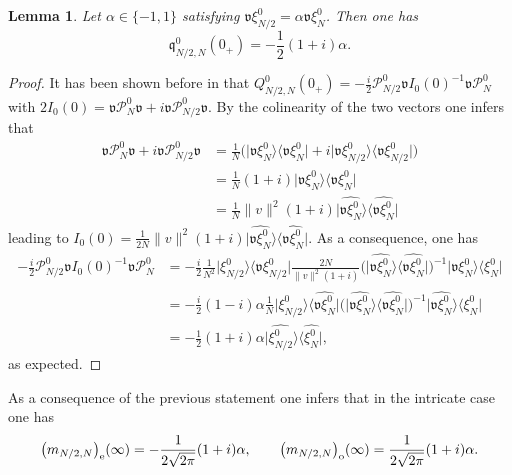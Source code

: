 \documentclass[11pt]{article}
\def\P{\mathcal P}
\def\v{\mathfrak v}
\def\ltwo{\mathop{\mathrm{L}^2}\nolimits}
\def\q{\mathfrak{q}}
\newtheorem{Lemma}[Theorem]{Lemma}
\begin{document}
\begin{Lemma}\label{lem_limit1}
Let $\alpha\in \{-1,1\}$ satisfying $\v\xi^0_{N/2}=\alpha \v \xi^0_N$. Then one has
$$
\q^0_{N/2,N}(0_+) = -\frac{1}{2}(1+i)\alpha.
$$
\end{Lemma}

\begin{proof}
It has been shown before in \cite[Lemma 4.10]{NRT} that $Q^0_{N/2,N}(0_+)= -\frac{i}{2}\P^0_{N/2}\v I_0(0)^{-1}\v\P^0_N$
with $2 I_0(0)=\v \P^0_N\v+i\v \P^0_{N/2}\v$.
By the colinearity of the two vectors one infers that
\begin{align*}
\v \P^0_N\v+i\v \P^0_{N/2}\v 
& = \frac{1}{N} \Big(\big|\v\xi_{N}^0\big\rangle \big\langle \v\xi_{N}^0\big|
+ i \big|\v\xi_{N/2}^0\big\rangle \big\langle \v\xi_{N/2}^0\big|\Big) \\
& = \frac{1}{N} (1+i)  \big|\v\xi_{N}^0\big\rangle \big\langle \v\xi_{N}^0\big| \\
& = \frac{1}{N}\|v\|_{\ltwo}^2 (1+i)  \big|\widehat{\v\xi_{N}^0}\big\rangle \big\langle \widehat{\v\xi_{N}^0}\big|
\end{align*}
leading to $I_0(0)=\frac{1}{2N} \|v\|_{\ltwo}^2 (1+i)  \big|\widehat{\v\xi_{N}^0}\big\rangle \big\langle \widehat{\v\xi_{N}^0}\big|$.
As a consequence, one has
\begin{align*}
-\frac{i}{2}\P^0_{N/2}\v I_0(0)^{-1}\v\P^0_N
& = -\frac{i}{2}\frac{1}{N^2}\big|\xi_{N/2}^0\big\rangle \big\langle \v\xi_{N/2}^0\big|
\frac{2N}{\|v\|_{\ltwo}^2 (1+i)} \Big( \big|\widehat{\v\xi_{N}^0}\big\rangle \big\langle \widehat{\v\xi_{N}^0}\big|\Big)^{-1}
\big|\v\xi_{N}^0\big\rangle \big\langle \xi_{N}^0\big| \\
& = -\frac{i}{2}(1-i) \alpha \frac{1}{N}\big|\xi_{N/2}^0\big\rangle \big\langle \widehat{\v\xi_{N}^0}\big|
\Big( \big|\widehat{\v\xi_{N}^0}\big\rangle \big\langle \widehat{\v\xi_{N}^0}\big|\Big)^{-1}
\big|\widehat{\v\xi_{N}^0}\big\rangle \big\langle \xi_{N}^0\big| \\
& = -\frac{1}{2}(1+i) \alpha \big|\widehat{\xi_{N/2}^0}\big\rangle  \big\langle \widehat{\xi_{N}^0}\big|,
\end{align*}
as expected.
\end{proof}

As a consequence of the previous statement one infers that in the intricate case one has
\begin{equation*}
\big(m_{N/2,N}\big)_{\rm e}(\infty) = -\frac{1}{2\sqrt{2\pi}}(1+i)\alpha, 
\qquad \big(m_{N/2,N}\big)_{\rm o}(\infty) = \frac{1}{2\sqrt{2\pi}}(1+i)\alpha. 
\end{equation*}
\end{document}
